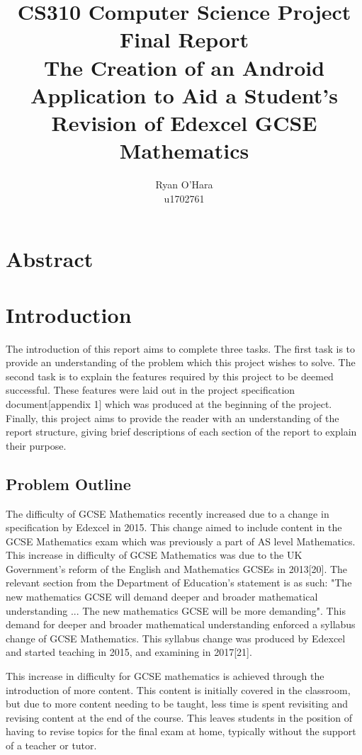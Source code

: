 \documentclass{article}
\title{CS310 Computer Science Project \\ Final Report \\ The Creation of an Android Application to Aid a Student's Revision of Edexcel GCSE Mathematics}
\author{Ryan O'Hara \\ u1702761}
\begin{document}
\maketitle

\newpage

\tableofcontents

\newpage

\section{Abstract}
\label{section:abstract}

\section{Introduction}
\label{section:introduction}

The introduction of this report aims to complete three tasks. The first task is to provide an understanding of the problem which this project wishes to solve. The second task is to explain the features required by this project to be deemed successful. These features were laid out in the project specification document[appendix 1] which was produced at the beginning of the project. Finally, this project aims to provide the reader with an understanding of the report structure, giving brief descriptions of each section of the report to explain their purpose.

\subsection{Problem Outline}

The difficulty of GCSE Mathematics recently increased due to a change in specification by Edexcel in 2015. This change aimed to include content in the GCSE Mathematics exam which was previously a part of AS level Mathematics. This increase in difficulty of GCSE Mathematics was due to the UK Government's reform of the English and Mathematics GCSEs in 2013[20]. The relevant section from the Department of Education's statement is as such: "The new mathematics GCSE will demand deeper and broader mathematical understanding ...  The new mathematics GCSE will be more demanding". This demand for deeper and broader mathematical understanding enforced a syllabus change of GCSE Mathematics. This syllabus change was produced by Edexcel and started teaching in 2015, and examining in 2017[21]. \par

This increase in difficulty for GCSE mathematics is achieved through the introduction of more content. This content is initially covered in the classroom, but due to more content needing to be taught, less time is spent revisiting and revising content at the end of the course. This leaves students in the position of having to revise topics for the final exam at home, typically without the support of a teacher or tutor. \par
\end{document}
